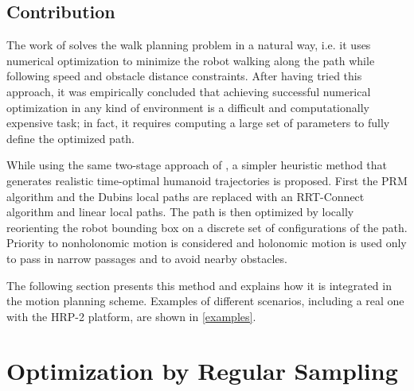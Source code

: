 \subsection{Contribution}
\noindent The work of \cite{moul10} solves the walk planning problem
in a natural way, i.e. it uses numerical optimization to minimize the
robot walking along the path while following speed and obstacle
distance constraints. After having tried this approach, it was
empirically concluded that achieving successful numerical optimization
in any kind of environment is a difficult and computationally
expensive task; in fact, it requires computing a large set of
parameters to fully define the optimized path.

While using the same two-stage approach of \cite{yosh08}, a simpler
heuristic method that generates realistic time-optimal humanoid
trajectories is proposed. First the PRM algorithm and the Dubins local
paths are replaced with an RRT-Connect algorithm and linear local
paths. The path is then optimized by locally reorienting the robot
bounding box on a discrete set of configurations of the path. Priority
to nonholonomic motion is considered and holonomic motion is used only
to pass in narrow passages and to avoid nearby obstacles.

The following section presents this method and explains how it is
integrated in the motion planning scheme. Examples of different
scenarios, including a real one with the HRP-2 platform, are shown in
\autoref{examples}.

\section{Optimization by Regular Sampling}
\label{regular-sampling-optim}

